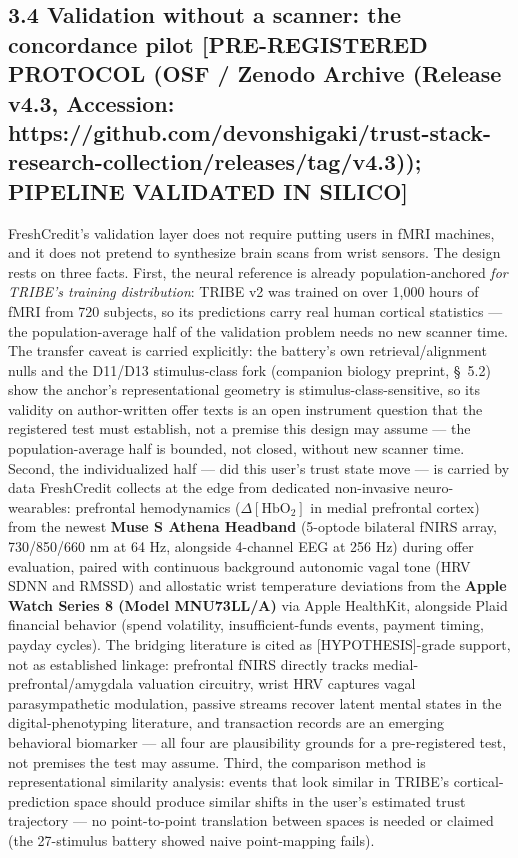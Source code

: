 \documentclass[
]{article}
\begin{document}
\subsection{3.4 Validation without a scanner: the concordance pilot
{[}PRE-REGISTERED PROTOCOL (OSF / Zenodo Archive (Release v4.3,
Accession:
https://github.com/devonshigaki/trust-stack-research-collection/releases/tag/v4.3));
PIPELINE VALIDATED IN
SILICO{]}}\label{validation-without-a-scanner-the-concordance-pilot-pre-registered-protocol-osf-zenodo-archive-release-v4.3-accession-httpsgithub.comdevonshigakitrust-stack-research-collectionreleasestagv4.3-pipeline-validated-in-silico}

FreshCredit's validation layer does not require putting users in fMRI
machines, and it does not pretend to synthesize brain scans from wrist
sensors. The design rests on three facts. First, the neural reference is
already population-anchored \emph{for TRIBE's training distribution}:
TRIBE v2 was trained on over 1,000 hours of fMRI from 720 subjects, so
its predictions carry real human cortical statistics --- the
population-average half of the validation problem needs no new scanner
time. The transfer caveat is carried explicitly: the battery's own
retrieval/alignment nulls and the D11/D13 stimulus-class fork (companion
biology preprint, §~5.2) show the anchor's representational geometry is
stimulus-class-sensitive, so its validity on author-written offer texts
is an open instrument question that the registered test must establish,
not a premise this design may assume --- the population-average half is
bounded, not closed, without new scanner time. Second, the
individualized half --- did this user's trust state move --- is carried
by data FreshCredit collects at the edge from dedicated non-invasive
neuro-wearables: prefrontal hemodynamics (\(\Delta [\mathrm{HbO}_2]\) in
medial prefrontal cortex) from the newest \textbf{Muse S Athena
Headband} (5-optode bilateral fNIRS array, 730/850/660 nm at 64 Hz,
alongside 4-channel EEG at 256 Hz) during offer evaluation, paired with
continuous background autonomic vagal tone (HRV SDNN and RMSSD) and
allostatic wrist temperature deviations from the \textbf{Apple Watch
Series 8 (Model MNU73LL/A)} via Apple HealthKit, alongside Plaid
financial behavior (spend volatility, insufficient-funds events, payment
timing, payday cycles). The bridging literature is cited as
{[}HYPOTHESIS{]}-grade support, not as established linkage: prefrontal
fNIRS directly tracks medial-prefrontal/amygdala valuation circuitry,
wrist HRV captures vagal parasympathetic modulation, passive streams
recover latent mental states in the digital-phenotyping literature, and
transaction records are an emerging behavioral biomarker --- all four
are plausibility grounds for a pre-registered test, not premises the
test may assume. Third, the comparison method is representational
similarity analysis: events that look similar in TRIBE's
cortical-prediction space should produce similar shifts in the user's
estimated trust trajectory --- no point-to-point translation between
spaces is needed or claimed (the 27-stimulus battery showed naive
point-mapping fails).
\end{document}

